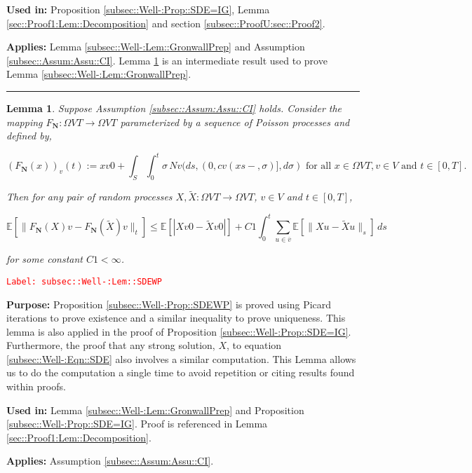\documentclass[12pt]{article}
\newcommand{\mb}{\mathbb}
\newcommand{\ra}{\rightarrow}
\newcommand{\ov}{\overline}
\newcommand{\te}{\text}
\newcommand{\tr}{\textcolor{red}}
\newcommand{\labe}[1]{\tr{\texttt{Label: #1}}}
\newcommand{\purpose}{\textbf{Purpose: }}
\newcommand{\usein}{\textbf{Used in: }}
\newcommand{\app}{\textbf{Applies: }}
\newcommand{\lin}{\rule{\linewidth}{0.4 pt}}
\newcommand{\ex}[1]{\mb{E}\left[#1\right]}			%
\renewcommand{\v}{v}							%
\newcommand{\vv}{u}								%
\renewcommand{\S}{S}							%
\newcommand{\s}{\sigma}							%
\newcommand{\T}{T}								%
\newcommand{\x}{x}								%
\renewcommand{\t}{t}							%
\renewcommand{\tt}{s}							%
\newcommand{\X}{X}								%
\newcommand{\IGr}{c}							%
\newcommand{\cl}{\ov}							%
\newcommand{\ve}[1]{_{#1}}						%
\newcommand{\tp}[1]{(#1)}						%
\newcommand{\const}{C}							%
\newcommand{\poisses}{\mathbf{N}}				%
\newcommand{\poiss}{N}							%
\newcommand{\Fpo}{F_{\poisses}}					%
\newcommand{\alt}[1]{\widetilde{#1}}			%
\newtheorem{lem}[thms]{Lemma}
\begin{document}
\usein Proposition \ref{subsec::Well-:Prop::SDE=IG}, Lemma \ref{sec::Proof1:Lem::Decomposition} and section \ref{subsec::ProofU:sec::Proof2}.

\app Lemma \ref{subsec::Well-:Lem::GronwallPrep} and Assumption \ref{subsec::Assum:Assu::CI}. Lemma \ref{subsec::Well-:Lem::SDEWP} is an intermediate result used to prove Lemma \ref{subsec::Well-:Lem::GronwallPrep}.

\lin

\begin{lem}
Suppose Assumption \ref{subsec::Assum:Assu::CI} holds. Consider the mapping \(\Fpo: \Omega{V}{\T} \ra \Omega{V}{\T}\) parameterized by a sequence of Poisson processes and defined by,

\[\left(\Fpo(\x{}{})\right)\ve{\v}\tp{\t} := \x{\v}{0} + \int_\S\int_0^\t \s \,\poiss{\v}(d\tt,(0,\IGr{\v}(\x{}{\tt-},\s)],d\s) \te{ for all }\x{}{} \in \Omega{V}{\T}, \v \in V\te{ and }\t \in [0,\T].\]

Then for any pair of random processes \(\X{}{},\alt{\X}{}{}:\Omega{V}{\T} \ra \Omega{V}{\T}\), \(\v\in V\) and \(\t \in [0,\T]\),

\[\ex{\|\Fpo(\X{}{}){\v} - \Fpo(\alt{\X}{}{}){\v}\|_\t} \leq \ex{|\X{\v}{0} - \alt{\X}{\v}{0}|} +  \const{1}\int_0^\t \sum_{\vv\in \cl{\v}} \ex{\|\X{\vv}{} - \alt{\X}{\vv}{}\|_\tt}\,d\tt\]

for some constant \(\const{1} < \infty\).

\label{subsec::Well-:Lem::SDEWP}
\end{lem}
\labe{subsec::Well-:Lem::SDEWP}

\purpose Proposition \ref{subsec::Well-:Prop::SDEWP} is proved using Picard iterations to prove existence and a similar inequality to prove uniqueness. This lemma is also applied in the proof of Proposition \ref{subsec::Well-:Prop::SDE=IG}. Furthermore, the proof that any strong solution, \(\X{}{}\), to equation \eqref{subsec::Well-:Eqn::SDE} also involves a similar computation. This Lemma allows us to do the computation a single time to avoid repetition or citing results found within proofs.

\usein Lemma \ref{subsec::Well-:Lem::GronwallPrep} and Proposition \ref{subsec::Well-:Prop::SDE=IG}. Proof is referenced in Lemma \ref{sec::Proof1:Lem::Decomposition}.

\app Assumption \ref{subsec::Assum:Assu::CI}.
\end{document}
